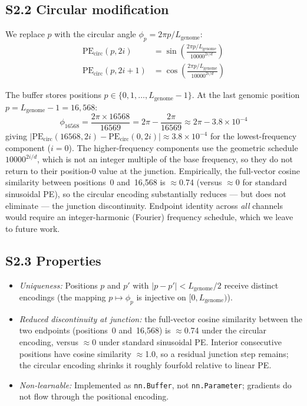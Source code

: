 \documentclass[10pt]{article}
\begin{document}
\subsection*{S2.2 Circular modification}

We replace $p$ with the circular angle $\phi_p = 2\pi p / L_\text{genome}$:
\begin{align}
\text{PE}_\text{circ}(p, 2i) &= \sin\!\left(\frac{2\pi p / L_\text{genome}}{10000^{2i/d}}\right) \\
\text{PE}_\text{circ}(p, 2i+1) &= \cos\!\left(\frac{2\pi p / L_\text{genome}}{10000^{2i/d}}\right)
\end{align}

The buffer stores positions $p \in \{0, 1, \ldots, L_\text{genome}-1\}$. At the last genomic
position $p = L_\text{genome} - 1 = 16{,}568$:
\[
\phi_{16568} = \frac{2\pi \times 16568}{16569} = 2\pi - \frac{2\pi}{16569} \approx 2\pi - 3.8\times10^{-4}
\]
giving $|\text{PE}_\text{circ}(16568, 2i) - \text{PE}_\text{circ}(0, 2i)| \approx 3.8\times10^{-4}$
for the lowest-frequency component ($i=0$). The higher-frequency components use the geometric
schedule $10000^{2i/d}$, which is not an integer multiple of the base frequency, so they do not
return to their position-0 value at the junction. Empirically, the full-vector cosine similarity
between positions~0 and~16,568 is $\approx$0.74 (versus $\approx$0 for standard sinusoidal PE),
so the circular encoding substantially reduces --- but does not eliminate --- the junction
discontinuity. Endpoint identity across \emph{all} channels would require an integer-harmonic
(Fourier) frequency schedule, which we leave to future work.

\subsection*{S2.3 Properties}

\begin{itemize}
\item \textit{Uniqueness:} Positions $p$ and $p'$ with $|p - p'| < L_\text{genome}/2$ receive
distinct encodings (the mapping $p \mapsto \phi_p$ is injective on $[0, L_\text{genome})$).

\item \textit{Reduced discontinuity at junction:} the full-vector cosine similarity between the
two endpoints (positions~0 and~16,568) is $\approx$0.74 under the circular encoding, versus
$\approx$0 under standard sinusoidal PE. Interior consecutive positions have cosine similarity
$\approx$1.0, so a residual junction step remains; the circular encoding shrinks it roughly
fourfold relative to linear PE.

\item \textit{Non-learnable:} Implemented as \texttt{nn.Buffer}, not \texttt{nn.Parameter};
gradients do not flow through the positional encoding.
\end{itemize}
\end{document}
